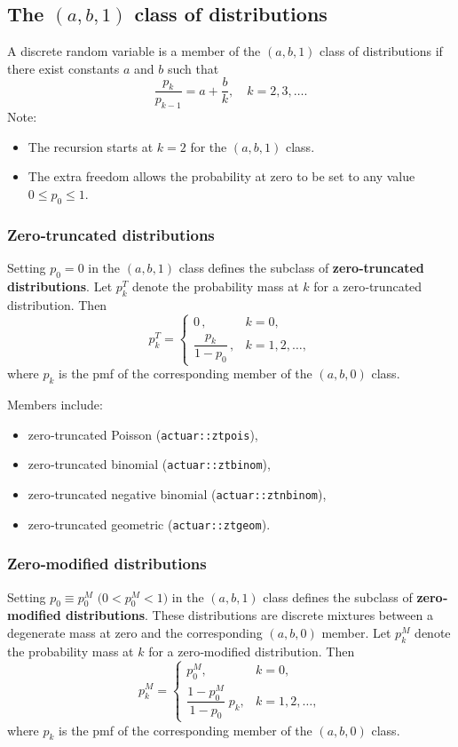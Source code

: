 \documentclass[11pt]{article}
\newcommand{\noi}{\noindent}
\begin{document}
\subsection{The \((a,b,1)\) class of distributions}
\noi A discrete random variable is a member of the \((a,b,1)\) class of distributions if there exist constants \(a\) and \(b\) such that
\[
\frac{p_k}{p_{k-1}}
= a + \frac{b}{k},
\quad k = 2,3,\dots.
\]
\noi Note:
\begin{itemize}
  \item The recursion starts at \(k=2\) for the \((a,b,1)\) class.
  \item The extra freedom allows the probability at zero to be set to any value \(0 \le p_0 \le 1\).
\end{itemize}

\subsubsection{Zero‐truncated distributions}
\noi Setting $p_0=0$ in the \((a,b,1)\) class defines the subclass of \textbf{zero‐truncated distributions}.  Let $p_k^T$ denote the probability mass at $k$ for a zero‐truncated distribution.  Then
\[
p_k^T
=\begin{cases}
0\,,&k=0,\\[0.3em]
\dfrac{p_k}{1-p_0}\,,&k=1,2,\dots,
\end{cases}
\]
where $p_k$ is the pmf of the corresponding member of the \((a,b,0)\) class.  

\noi Members include:
\begin{itemize}
  \item zero‐truncated Poisson (\texttt{actuar::ztpois}),
  \item zero‐truncated binomial (\texttt{actuar::ztbinom}),
  \item zero‐truncated negative binomial (\texttt{actuar::ztnbinom}),
  \item zero‐truncated geometric (\texttt{actuar::ztgeom}).
\end{itemize}

\subsubsection{Zero‐modified distributions}
\noi Setting \(p_0\equiv p_0^M\) \(\bigl(0<p_0^M<1\bigr)\) in the \((a,b,1)\) class defines the subclass of \textbf{zero‐modified distributions}.  These distributions are discrete mixtures between a degenerate mass at zero and the corresponding \((a,b,0)\) member.  Let \(p_k^M\) denote the probability mass at \(k\) for a zero‐modified distribution.  Then
\[
p_k^M
=\begin{cases}
p_0^M, & k = 0,\\[0.3em]
\dfrac{1 - p_0^M}{\,1 - p_0\,}\;p_k, & k = 1,2,\dots,
\end{cases}
\]
where \(p_k\) is the pmf of the corresponding member of the \((a,b,0)\) class.  
\end{document}
